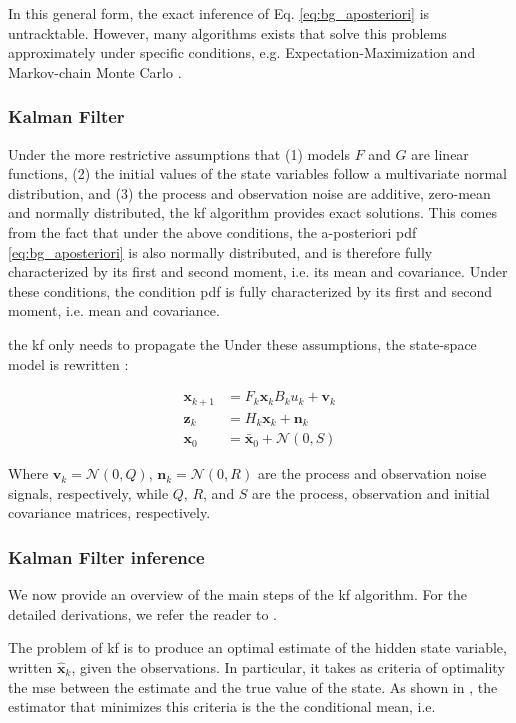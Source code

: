 In this general form, the exact inference of Eq. \ref{eq:bg_aposteriori} is untracktable.
However, many algorithms exists that solve this problems approximately under specific conditions, e.g. Expectation-Maximization \cite{dempster77} and Markov-chain Monte Carlo \cite{geyer92}.

\subsubsection{Kalman Filter}

Under the more restrictive assumptions that (1) models $F$ and $G$ are linear functions, (2) the initial values of the state variables follow a multivariate normal distribution, and (3) the process and observation noise are additive, zero-mean and normally distributed, the \gls{kf} algorithm provides exact solutions.
This comes from the fact that under the above conditions, the a-posteriori pdf \ref{eq:bg_aposteriori} is also normally distributed, and is therefore fully characterized by its first and second moment, i.e. its mean and covariance.
Under these conditions, the condition \gls{pdf} is fully characterized by its first and second moment, i.e. mean and covariance.

the \gls{kf} only needs to propagate the
Under these assumptions, the state-space model is rewritten :

\begin{align}
  \bm{x}_{k+1}&=F_{k}\bm{x}_{k} B_{k}u_{k} + \bm{v}_{k} \label{eq:bg_state_trans_kf}\\
  \bm{z}_{k}&= H_{k}\bm{x}_{k} + \bm{n}_{k} \label{eq:bg_proc_kf} \\
  \bm{x}_{0}&= \bm{\bar{x}}_{0} + \mathcal{N}(0,S) \label{eq:bg_init_kf}
\end{align}

Where $\bm{v}_{k}=\mathcal{N}(0,Q)$, $\bm{n}_{k}=\mathcal{N}(0,R)$ are the process and observation noise signals, respectively, while $Q$, $R$, and $S$ are the process, observation and initial covariance matrices, respectively.

\subsubsection{Kalman Filter inference}
We now provide an overview of the main steps of the \gls{kf} algorithm.
For the detailed derivations, we refer the reader to \cite{thacker98}.

The problem of \gls{kf} is to produce an optimal estimate of the hidden state variable, written $\bm{\hat x}_{k}$, given the observations.
In particular, it takes as criteria of optimality the \gls{mse} between the estimate and the true value of the state.
As shown in \cite{ribeiro04}, the estimator that minimizes this criteria is the the conditional mean, i.e.

